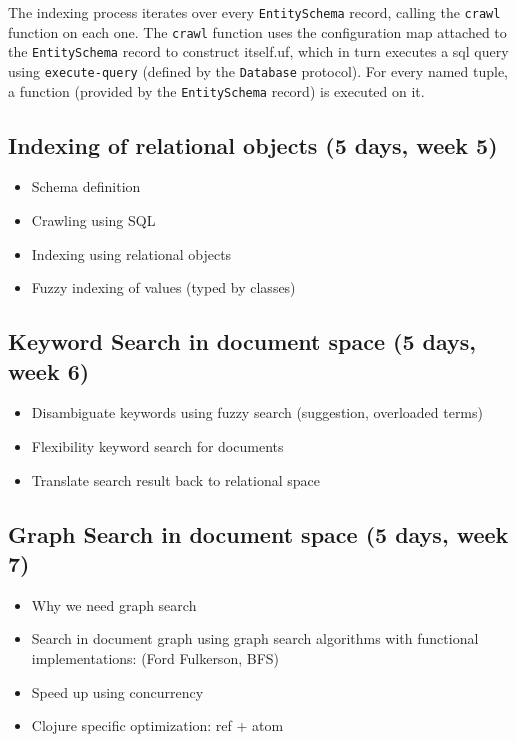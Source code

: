 			The indexing process iterates over every \texttt{EntitySchema} record, calling the \texttt{crawl} function on each one.  The \texttt{crawl} function uses the configuration map attached to the \texttt{EntitySchema} record to construct itself.uf, which in turn executes a \gls{sql} query using \texttt{execute-query} (defined by the \texttt{Database} protocol).  For every named tuple, a function (provided by the \texttt{EntitySchema} record) is executed on it.
			
			

	\subsection{Indexing of relational objects (5 days, week 5)}
		\begin{itemize}
			\item Schema definition
			\item Crawling using SQL
			\item Indexing using relational objects
			\item Fuzzy indexing of values (typed by classes)
		\end{itemize}

	\subsection{Keyword Search in document space (5 days, week 6)}
		\begin{itemize}
			\item Disambiguate keywords using fuzzy search (suggestion, overloaded terms)
			\item Flexibility keyword search for documents
			\item Translate search result back to relational space
		\end{itemize}

	\subsection{Graph Search in document space (5 days, week 7)}
		\begin{itemize}
			\item Why we need graph search
			\item Search in document graph using graph search algorithms with functional implementations: (Ford Fulkerson, BFS)
			\item Speed up using concurrency
			\item Clojure specific optimization: ref + atom
		\end{itemize}